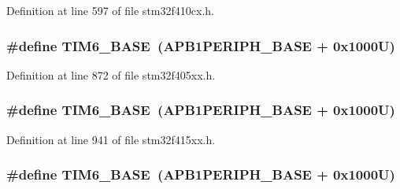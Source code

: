 Definition at line 597 of file stm32f410cx.\+h.

\subsubsection[{\texorpdfstring{T\+I\+M6\+\_\+\+B\+A\+SE}{TIM6_BASE}}]{\setlength{\rightskip}{0pt plus 5cm}\#define T\+I\+M6\+\_\+\+B\+A\+SE~({\bf A\+P\+B1\+P\+E\+R\+I\+P\+H\+\_\+\+B\+A\+SE} + 0x1000\+U)}\hypertarget{group___peripheral__registers__structures_ga8268ec947929f192559f28c6bf7d1eac}{}\label{group___peripheral__registers__structures_ga8268ec947929f192559f28c6bf7d1eac}


Definition at line 872 of file stm32f405xx.\+h.

\subsubsection[{\texorpdfstring{T\+I\+M6\+\_\+\+B\+A\+SE}{TIM6_BASE}}]{\setlength{\rightskip}{0pt plus 5cm}\#define T\+I\+M6\+\_\+\+B\+A\+SE~({\bf A\+P\+B1\+P\+E\+R\+I\+P\+H\+\_\+\+B\+A\+SE} + 0x1000\+U)}\hypertarget{group___peripheral__registers__structures_ga8268ec947929f192559f28c6bf7d1eac}{}\label{group___peripheral__registers__structures_ga8268ec947929f192559f28c6bf7d1eac}


Definition at line 941 of file stm32f415xx.\+h.

\subsubsection[{\texorpdfstring{T\+I\+M6\+\_\+\+B\+A\+SE}{TIM6_BASE}}]{\setlength{\rightskip}{0pt plus 5cm}\#define T\+I\+M6\+\_\+\+B\+A\+SE~({\bf A\+P\+B1\+P\+E\+R\+I\+P\+H\+\_\+\+B\+A\+SE} + 0x1000\+U)}\hypertarget{group___peripheral__registers__structures_ga8268ec947929f192559f28c6bf7d1eac}{}\label{group___peripheral__registers__structures_ga8268ec947929f192559f28c6bf7d1eac}


